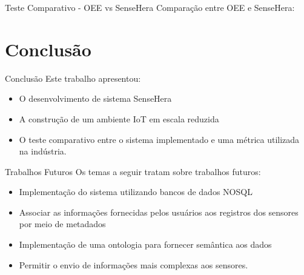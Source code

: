 \documentclass{beamer}
\begin{document}
    \begin{frame}{Teste Comparativo - OEE vs SenseHera}
      \quad Comparação entre OEE e SenseHera:
      \begin{center}
      \end{center}
    \end{frame}
  \section{Conclusão}
    \begin{frame}{ Conclusão }
      \quad Este trabalho apresentou:
      \begin{itemize}
        \item O desenvolvimento de sistema SenseHera
        \item A construção de um ambiente IoT em escala reduzida
        \item O teste comparativo entre o sistema implementado e uma métrica utilizada na indústria.
      \end{itemize}
    \end{frame}

    \begin{frame}{Trabalhos Futuros}
      \quad Os temas a seguir tratam sobre trabalhos futuros:
      \begin{itemize}
        \item Implementação do sistema utilizando bancos de dados NOSQL
        \item Associar as informações fornecidas pelos usuários aos registros dos sensores por meio de metadados
        \item Implementação de uma ontologia para fornecer semântica aos dados
        \item Permitir o envio de informações mais complexas aos sensores.
      \end{itemize}

    \end{frame}
\end{document}
